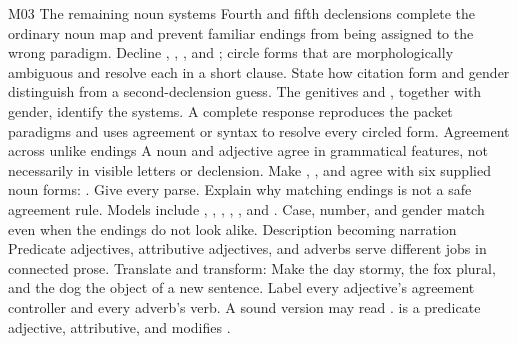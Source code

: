 \begin{courseunit}{M03}
\SubmoduleExtension
  {The remaining noun systems}
  {Fourth and fifth declensions complete the ordinary noun map and prevent
  familiar endings from being assigned to the wrong paradigm.}
  {Decline , , , and ; circle forms that are morphologically
  ambiguous and resolve each in a short clause.}
  {State how citation form and gender distinguish  from a
  second-declension guess.}
  {The genitives  and , together with gender,
  identify the systems.  A complete response reproduces the packet paradigms
  and uses agreement or syntax to resolve every circled form.}
\SubmoduleExtension
  {Agreement across unlike endings}
  {A noun and adjective agree in grammatical features, not necessarily in
  visible letters or declension.}
  {Make , , and  agree with six supplied noun forms: .  Give every parse.}
  {Explain why matching endings is not a safe agreement rule.}
  {Models include , , , , , and
  .  Case, number, and gender match even when the endings do
  not look alike.}
\SubmoduleExtension
  {Description becoming narration}
  {Predicate adjectives, attributive adjectives, and adverbs serve different
  jobs in connected prose.}
  {Translate and transform:   Make the day stormy, the
  fox plural, and the dog the object of a new sentence.}
  {Label every adjective's agreement controller and every adverb's verb.}
  {A sound version may read .   is a
  predicate adjective,  attributive, and 
  modifies .}
\end{courseunit}

